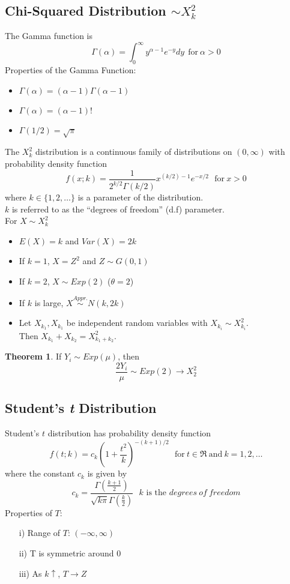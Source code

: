 \documentclass[12pt, leqno]{article}
\theoremstyle{definition}
\newtheorem*{theorem}{Theorem}
\begin{document}
  \subsection{Chi-Squared Distribution $\sim X_{k}^{2}$}
  The Gamma function is
  $$\Gamma(\alpha) = \int_{0}^{\infty}y^{\alpha -1}e^{-y}dy ~~\text{for}~\alpha > 0$$
  Properties of the Gamma Function:
  \begin{itemize}
    \item $\Gamma(\alpha) = (\alpha - 1)\Gamma(\alpha - 1)$
    \item $\Gamma(\alpha) = (\alpha - 1)!$
    \item $\Gamma(1/2) = \sqrt{\pi}$
  \end{itemize}
  The $X_{k}^{2}$ distribution is a continuous family of distributions on $(0, \infty)$ with probability density function
  $$f(x;k) = \frac{1}{2^{k/2}\Gamma(k/2)}x^{(k/2)-1}e^{-x/2}~~~\text{for}~x > 0$$
  where $k \in \{1, 2, \dots\}$ is a parameter of the distribution. \\
  $k$ is referred to as the ``degrees of freedom'' (d.f) parameter. \\

  For $X \sim X_{k}^{2}$
  \begin{itemize}
    \item $E(X) = k$ and $Var(X) = 2k$
    \item If $k = 1$, $X = Z^{2}$ and $Z \sim G(0,1)$
    \item If $k = 2$, $X \sim Exp(2)$ ($\theta = 2$)
    \item If $k$ is large, $X \stackrel{Appr.}{\sim} N(k, 2k)$
    \item Let $X_{k_{1}}, X_{k_{1}}$ be independent random variables with $X_{k_{i}} \sim X_{k_{i}}^{2}$. \\
    Then $X_{k_{1}} + X_{k_{2}} =  X_{k_{1} + k_{2}}^{2}$.
  \end{itemize}

  \begin{theorem}
    If $Y_{i} \sim Exp(\mu)$, then
    $$\frac{2Y_{i}}{\mu} \sim Exp(2) \rightarrow X_{2}^{2}$$
  \end{theorem}

  \subsection{Student's \emph{t} Distribution}
  Student's $t$ distribution has probability density function
  $$
  f(t;k) = c_{k}\left(1 + \frac{t^{2}}{k}\right)^{-(k+1)/2}
  ~~~\text{for}~t \in \Re~\text{and}~ k = 1, 2, \dots
  $$
  where the constant $c_{k}$ is given by
  $$
  c_{k} = \frac{\Gamma(\frac{k+1}{2})}{\sqrt{k\pi}\Gamma(\frac{k}{2})}
  ~~~k\text{ is the }degrees~of~freedom
  $$
  Properties of $T$:
  \begin{itemize}
    \item[i)] Range of $T$: $(-\infty, \infty)$
    \item[ii)] T is symmetric around 0
    \item[iii)] As $k \uparrow$, $T \rightarrow Z$
  \end{itemize}
\end{document}
